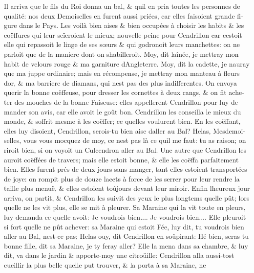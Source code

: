 \documentclass[14pt,a4paper]{memoir}
\begin{document}
{{\begin{otherlanguage}{french}
Il arriva que le fils du Roi donna un bal, \& qu\textquotesingle il en
pria toutes les personnes de qualité: nos deux Demoiselles en furent
aussi priées, car elles faisoient grande figure dans le Pays. Les voilà
bien aises \& bien occupées à choisir les habits \& les coëffures qui
leur seïeroient le mieux; nouvelle peine pour Cendrillon car
c\textquotesingle estoit elle qui repassoit le linge de ses sœurs \& qui
godronoit leurs manchettes: on ne parloit que de la maniere dont on
s\textquotesingle habilleroit. Moy, dit l\textquotesingle aînée, je
mettray mon habit de velours rouge \& ma garniture
d\textquotesingle Angleterre. Moy, dit la cadette, je
n\textquotesingle auray que ma juppe ordinaire; mais en récompense, je
mettray mon manteau à fleurs d\textquotesingle or, \& ma barriere de
diamans, qui n\textquotesingle est pas des plus indifferentes. On envoya
querir la bonne coëffeuse, pour dresser les cornettes à deux rangs, \&
on fit acheter des mouches de la bonne Faiseuse: elles appellerent
Cendrillon pour luy demander son avis, car elle avoit le goût bon.
Cendrillon les conseilla le mieux du monde, \& s\textquotesingle offrit
mesme à les coëffer; ce qu\textquotesingle elles voulurent bien. En les
coëffant, elles luy disoient, Cendrillon, serois-tu bien aise
d\textquotesingle aller au Bal? Helas, Mesdemoiselles, vous vous mocquez
de moy, ce n\textquotesingle est pas là ce qu\textquotesingle il me
faut: tu as raison; on riroit bien, si on voyoit un Culcendron aller au
Bal. Une autre que Cendrillon les auroit coëffées de travers; mais elle
estoit bonne, \& elle les coëffa parfaitement bien. Elles furent prés de
deux jours sans manger, tant elles estoient transportées de joye: on
rompit plus de douze lacets à force de les serrer pour leur rendre la
taille plus menuë, \& elles estoient toûjours devant leur miroir. Enfin
l\textquotesingle heureux jour arriva, on partit, \& Cendrillon les
suivit des yeux le plus longtems qu\textquotesingle elle pût; lors
qu\textquotesingle elle ne les vit plus, elle se mit à pleurer. Sa
Maraine qui la vit toute en pleurs, luy demanda ce
qu\textquotesingle elle avoit: Je voudrois bien.... Je voudrois bien....
Elle pleuroit si fort qu\textquotesingle elle ne pût achever: sa Maraine
qui estoit Fée, luy dit, tu voudrois bien aller au Bal,
n\textquotesingle est-ce pas; Helas ouy, dit Cendrillon en soûpirant: Hé
bien, seras tu bonne fille, dit sa Maraine, je t\textquotesingle y feray
aller? Elle la mena dans sa chambre, \& luy dit, va dans le jardin \&
apporte-moy une citroüille: Cendrillon alla aussi-tost cueillir la plus
belle qu\textquotesingle elle put trouver, \& la porta à sa Maraine, ne

\end{otherlanguage}}}
\end{document}

